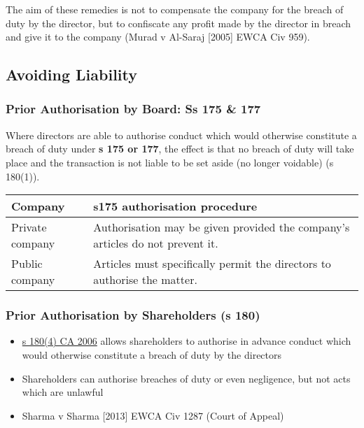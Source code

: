 \documentclass[
]{article}
\providecommand{\tightlist}{%
  \setlength{\itemsep}{0pt}\setlength{\parskip}{0pt}}
\begin{document}
The aim of these remedies is not to compensate the company for the
breach of duty by the director, but to confiscate any profit made by the
director in breach and give it to the company (Murad v Al-Saraj
{[}2005{]} EWCA Civ 959).

\hypertarget{avoiding-liability}{%
\subsection{Avoiding Liability}\label{avoiding-liability}}

\hypertarget{prior-authorisation-by-board-ss-175-177}{%
\subsubsection{Prior Authorisation by Board: Ss 175 \&
177}\label{prior-authorisation-by-board-ss-175-177}}

Where directors are able to authorise conduct which would otherwise
constitute a breach of duty under \textbf{s 175 or 177}, the effect is
that no breach of duty will take place and the transaction is not liable
to be set aside (no longer voidable) (s 180(1)).

\begin{longtable}[]{@{}ll@{}}
\toprule()
Company & s175 authorisation procedure \\
\midrule()
\endhead
Private company & Authorisation may be given provided the company's
articles do not prevent it. \\
Public company & Articles must specifically permit the directors to
authorise the matter. \\
\bottomrule()
\end{longtable}

\hypertarget{prior-authorisation-by-shareholders-s-180}{%
\subsubsection{Prior Authorisation by Shareholders (s
180)}\label{prior-authorisation-by-shareholders-s-180}}

\begin{itemize}
\tightlist
\item
  \href{https://www.legislation.gov.uk/ukpga/2006/46/section/180}{s
  180(4) CA 2006} allows shareholders to authorise in advance conduct
  which would otherwise constitute a breach of duty by the directors
\item
  Shareholders can authorise breaches of duty or even negligence, but
  not acts which are unlawful
\item
  Sharma v Sharma {[}2013{]} EWCA Civ 1287 (Court of Appeal)
\end{itemize}
\end{document}
